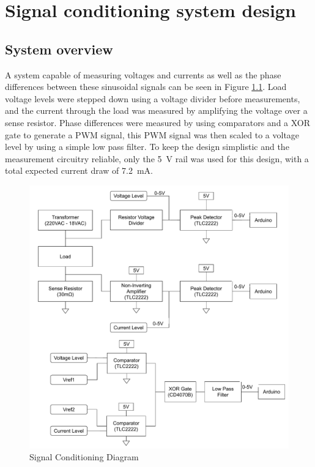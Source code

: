 \chapter{Signal conditioning system design}
\section{System overview} \label{sec:system}

A system capable of measuring voltages and currents as well as the phase differences between these sinusoidal signals can be seen in Figure \ref{fig:system_diagram}. Load voltage levels were stepped down using a voltage divider before measurements, and the current through the load was measured by amplifying the voltage over a sense resistor. Phase differences were measured by using comparators and a XOR gate to generate a PWM signal, this PWM signal was then scaled to a voltage level by using a simple low pass filter. To keep the design simplistic and the measurement circuitry reliable, only the \SI{5}{\volt} rail was used for this design, with a total expected current draw of \SI{7.2}{\milli A}.

\begin{figure}
    \centering
    \includegraphics[width = 0.46\linewidth]{Figures/measurement_diagram.pdf}
    \caption{Signal Conditioning Diagram}
    \label{fig:system_diagram}
\end{figure}









